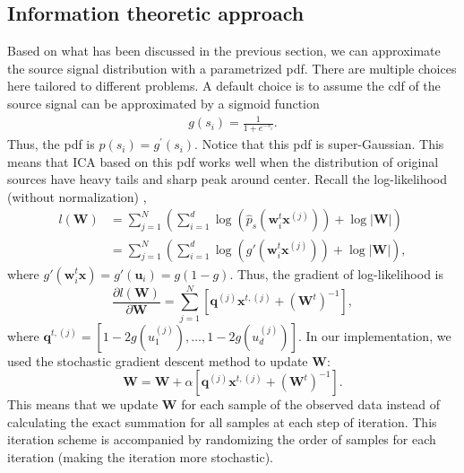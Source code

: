 \documentclass[aps,prl,preprint,superscriptaddress]{revtex4-2}
\begin{document}
\subsection{Information theoretic approach}
Based on what has been discussed in the previous section, we can approximate the source signal distribution with a parametrized pdf. There are multiple choices here tailored to different problems. A default choice is to assume the cdf of the source signal can be approximated by a sigmoid function
\begin{align}
g(s_{i}) = \frac{1}{1+e^{-s_{i}}}.
\end{align}
Thus, the pdf is $p(s_{i}) = g^{\prime}(s_{i})$.
Notice that this pdf is super-Gaussian. This means that ICA based on this pdf works well when the distribution of original sources have heavy tails and sharp peak around center. Recall the log-likelihood (without normalization) \cite{ng_cs229},
\begin{align}
l(\mathbf{W}) &= \sum_{j=1}^{N} \left(\sum_{i=1}^{d}\log(\hat{p}_{s}(\mathbf{w}_{i}^{t}\mathbf{x}^{(j)}))+\log|\mathbf{W}|\right) \\
&= \sum_{j=1}^{N} \left(\sum_{i=1}^{d}\log(g'(\mathbf{w}_{i}^{t}\mathbf{x}^{(j)}))+\log|\mathbf{W}| \right),
\end{align}
where $g'(\mathbf{w}_{i}^{t}\mathbf{x}) = g'(\mathbf{u}_{i}) = g(1-g)$.
Thus, the gradient of log-likelihood is
\begin{equation}
\frac{\partial l(\mathbf{W})}{\partial \mathbf{W}} = \sum_{j=1}^{N} [\mathbf{q}^{(j)}\mathbf{x}^{t, (j)} + (\mathbf{W}^{t})^{-1}],
\end{equation}
where $\mathbf{q}^{t, (j)} = [1-2g(u_{1}^{(j)}), \ldots ,1-2g(u_{d}^{(j)}) ]$.
In our implementation, we used the stochastic gradient descent method to update $\mathbf{W}$:
\begin{equation}
\mathbf{W} = \mathbf{W} + \alpha [\mathbf{q}^{(j)}\mathbf{x}^{t, (j)} + (\mathbf{W}^{t})^{-1}].
\end{equation}
This means that we update $\mathbf{W}$ for each sample of the observed data instead of calculating the exact summation for all samples at each step of iteration.
This iteration scheme is accompanied by randomizing the order of samples for each iteration (making the iteration more stochastic).
\end{document}
